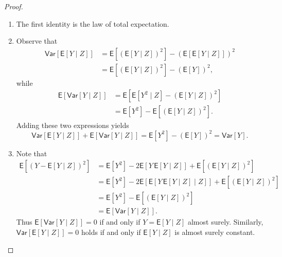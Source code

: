 \begin{proof}
\leavevmode
\begin{enumerate}[label=\roman*)]
\item
The first identity is the law of total expectation.

\item
Observe that
\begin{align*}
    \mathsf{Var}\!\left[\mathsf{E}[Y \mid Z]\right]
    &=
    \mathsf{E}\!\left[\left(\mathsf{E}[Y \mid Z]\right)^2\right]
    -
    \left(\mathsf{E}[\mathsf{E}[Y \mid Z]]\right)^2 \\
    &=
    \mathsf{E}\!\left[\left(\mathsf{E}[Y \mid Z]\right)^2\right]
    -
    \left(\mathsf{E}[Y]\right)^2,
\end{align*}
while
\begin{align*}
    \mathsf{E}\!\left[\mathsf{Var}[Y \mid Z]\right]
    &=
    \mathsf{E}\!\left[
        \mathsf{E}[Y^2 \mid Z]
        -
        \left(\mathsf{E}[Y \mid Z]\right)^2
    \right] \\
    &=
    \mathsf{E}[Y^2]
    -
    \mathsf{E}\!\left[\left(\mathsf{E}[Y \mid Z]\right)^2\right].
\end{align*}
Adding these two expressions yields
\[
    \mathsf{Var}[\mathsf{E}[Y \mid Z]]
    +
    \mathsf{E}[\mathsf{Var}[Y \mid Z]]
    =
    \mathsf{E}[Y^2]
    -
    \left(\mathsf{E}[Y]\right)^2
    =
    \mathsf{Var}[Y].
\]

\item
Note that
\begin{align*}
    \mathsf{E}\!\left[\left(Y - \mathsf{E}[Y \mid Z]\right)^2\right]
    &=
    \mathsf{E}[Y^2]
    -
    2\mathsf{E}\!\left[Y\,\mathsf{E}[Y \mid Z]\right]
    +
    \mathsf{E}\!\left[\left(\mathsf{E}[Y \mid Z]\right)^2\right] \\
    &=
    \mathsf{E}[Y^2]
    -
    2\mathsf{E}\!\left[\mathsf{E}\!\left[Y\,\mathsf{E}[Y \mid Z] \mid Z\right]\right]
    +
    \mathsf{E}\!\left[\left(\mathsf{E}[Y \mid Z]\right)^2\right] \\
    &=
    \mathsf{E}[Y^2]
    -
    \mathsf{E}\!\left[\left(\mathsf{E}[Y \mid Z]\right)^2\right] \\
    &=
    \mathsf{E}[\mathsf{Var}[Y \mid Z]].
\end{align*}
Thus \(\mathsf{E}[\mathsf{Var}[Y \mid Z]] = 0\) if and only if
\(Y = \mathsf{E}[Y \mid Z]\) almost surely.
Similarly, \(\mathsf{Var}[\mathsf{E}[Y \mid Z]] = 0\) holds if and only if
\(\mathsf{E}[Y \mid Z]\) is almost surely constant.
\end{enumerate}
\end{proof}


